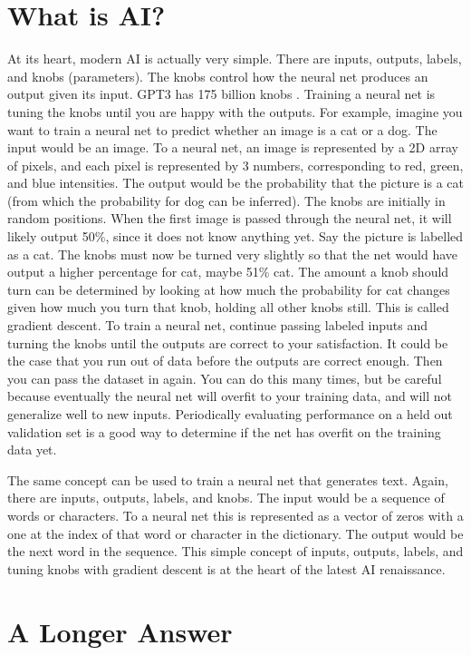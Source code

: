 \section{What is AI?}
At its heart, modern AI is actually very simple.  There are inputs, outputs, labels, and knobs (parameters).  The knobs control how the neural net produces an output given its input.  GPT3 has 175 billion knobs \cite{brown2020language}.  Training a neural net is tuning the knobs until you are happy with the outputs.  For example, imagine you want to train a neural net to predict whether an image is a cat or a dog.  The input would be an image.  To a neural net, an image is represented by a 2D array of pixels, and each pixel is represented by 3 numbers, corresponding to red, green, and blue intensities.  The output would be the probability that the picture is a cat (from which the probability for dog can be inferred).  The knobs are initially in random positions.  When the first image is passed through the neural net, it will likely output 50\%, since it does not know anything yet.  Say the picture is labelled as a cat.  The knobs must now be turned very slightly so that the net would have output a higher percentage for cat, maybe 51\% cat.  The amount a knob should turn can be determined by looking at how much the probability for cat changes given how much you turn that knob, holding all other knobs still.  This is called gradient descent. 
To train a neural net, continue passing labeled inputs and turning the knobs until the outputs are correct to your satisfaction.  It could be the case that you run out of data before the outputs are correct enough.  Then you can pass the dataset in again.  You can do this many times, but be careful because eventually the neural net will overfit to your training data, and will not generalize well to new inputs.  Periodically evaluating performance on a held out validation set is a good way to determine if the net has overfit on the training data yet.

The same concept can be used to train a neural net that generates text.  Again, there are inputs, outputs, labels, and knobs.  The input would be a sequence of words or characters.  To a neural net this is represented as a vector of zeros with a one at the index of that word or character in the dictionary.  The output would be the next word in the sequence.  This simple concept of inputs, outputs, labels, and tuning knobs with gradient descent is at the heart of the latest AI renaissance.

\section{A Longer Answer}

